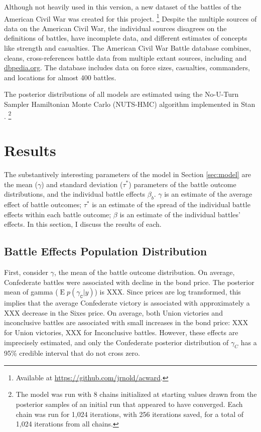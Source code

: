 \documentclass[11pt, oneside, article]{memoir}
\DeclareMathOperator{\E}{E}
\begin{document}
Although not heavily used in this version, a new dataset of the battles of the American Civil War was created for this project.%
\footnote{Available at \url{https://github.com/jrnold/acward}.}
Despite the multiple sources of data on the American Civil War, the individual sources disagrees on the definitions of battles, have incomplete data, and different estimates of concepts like strength and casualties.
The American Civil War Battle database combines, cleans, cross-references battle data from multiple extant sources, including \textcites{Phister1883}{Livermore1900}{Bodart1908}{dyer1908_war_rebel}{KennedyConservation1998}{CWSAC1993}{cwsac2012} and \href{http://dbpedia.org}{dbpedia.org}.
The database includes data on force sizes, casualties, commanders, and locations for almost 400 battles.

The posterior distributions of all models are estimated using the No-U-Turn Sampler Hamiltonian Monte Carlo (NUTS-HMC) algorithm implemented in \textsf{Stan} \parencites{Stan2013b}{HoffmanGelman2011}.%
\footnote{The model was run with 8 chains initialized at starting values drawn from the posterior samples of an initial run that appeared to have converged. 
Each chain was run for 1,024 iterations, with 256 iterations saved, for a total of 1,024 iterations from all chains.}

\section{Results}
\label{sec:results}

The substantively interesting parameters of the model in Section \ref{sec:model} are the mean ($\gamma$) and standard deviation ($\tau^*$) parameters of the battle outcome distributions, and the individual battle effects $\beta_{b}$.
$\gamma$ is an estimate of the average effect of battle outcomes;
$\tau^{*}$ is an estimate of the spread of the individual battle effects within each battle outcome;
$\beta$ is an estimate of the individual battles' effects.
In this section, I discuss the results of each.

\subsection{Battle Effects Population Distribution}
\label{sec:battle-results}

First, consider $\gamma$, the mean of the battle outcome distribution.
On average, Confederate battles were associated with decline in the bond price.
The posterior mean of gamma ($\E p(\gamma_{\mathtt{C}} | y)$) is XXX.
Since prices are log transformed, this implies that the average Confederate victory is associated with approximately a XXX decrease in the Sixes price.
On average, both Union victories and inconclusive battles are associated with small increases in the bond price:
XXX for Union victories, XXX for Inconclusive battles.
However, these effects are imprecisely estimated, and only the Confederate posterior distribution of $\gamma_{C}$ has a 95\% credible interval that do not cross zero.
\end{document}
